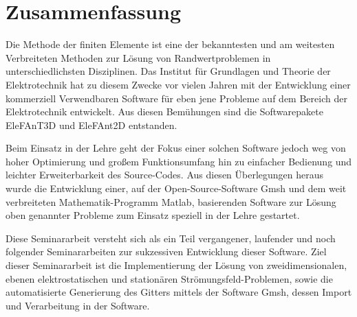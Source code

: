 
\section*{Zusammenfassung}
\vspace*{2cm}
\begin{large}

Die Methode der finiten Elemente ist eine der bekanntesten und am weitesten Verbreiteten Methoden zur Lösung von Randwertproblemen in unterschiedlichsten Disziplinen. Das Institut für Grundlagen und Theorie der Elektrotechnik hat zu diesem Zwecke vor vielen Jahren mit der Entwicklung einer kommerziell Verwendbaren Software für eben jene Probleme auf dem Bereich der Elektrotechnik entwickelt. Aus diesen Bemühungen sind die Softwarepakete EleFAnT3D und EleFAnt2D entstanden.\newline

Beim Einsatz in der Lehre geht der Fokus einer solchen Software jedoch weg von hoher Optimierung und großem Funktionsumfang hin zu einfacher Bedienung und leichter Erweiterbarkeit des Source-Codes. Aus diesen Überlegungen heraus wurde die Entwicklung einer, auf der Open-Source-Software Gmsh und dem weit verbreiteten Mathematik-Programm Matlab\textregistered, basierenden Software zur Lösung oben genannter Probleme zum Einsatz speziell in der Lehre gestartet.\newline

Diese Seminararbeit versteht sich als ein Teil vergangener, laufender und noch folgender Seminararbeiten zur sukzessiven Entwicklung dieser Software.  \newline
Ziel dieser Seminararbeit ist die Implementierung der Lösung von zweidimensionalen, ebenen elektrostatischen und stationären Strömungsfeld-Problemen, sowie die automatisierte Generierung des Gitters mittels der Software Gmsh, dessen Import und Verarbeitung in der Software.

\end{large}